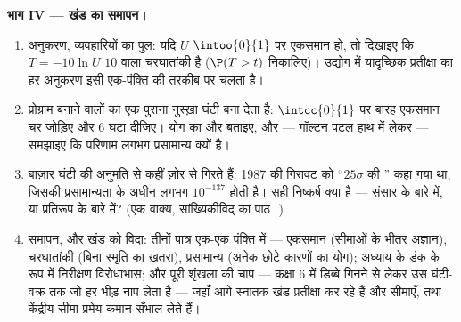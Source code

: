 \begin{problem}
\medskip
\noindent\textbf{भाग IV --- खंड का समापन।}
\begin{enumerate}[resume]
  \item अनुकरण, व्यवहारियों का पुल: यदि $U$ $\intoo{0}{1}$ पर एकसमान हो, तो दिखाइए
        कि $T = -10\ln U$  $10$ वाला चरघातांकी है ($\P(T > t)$ निकालिए)। उद्योग में
        यादृच्छिक प्रतीक्षा का हर अनुकरण इसी एक-पंक्ति की तरकीब पर चलता है।
  \item प्रोग्राम बनाने वालों का एक पुराना नुस्ख़ा घंटी बना देता है: $\intcc{0}{1}$ पर
        बारह  एकसमान चर जोड़िए और $6$ घटा दीजिए। योग का  और
         बताइए, और --- गॉल्टन पटल हाथ में लेकर --- समझाइए कि परिणाम
        लगभग प्रसामान्य क्यों है।
  \item बाज़ार घंटी की अनुमति से कहीं ज़ोर से गिरते हैं: 1987 की गिरावट को
        ``$25\sigma$ की '' कहा गया था, जिसकी प्रसामान्यता के अधीन 
        लगभग $10^{-137}$ होती है। सही निष्कर्ष क्या है --- संसार के बारे में, या
        प्रतिरूप के बारे में? (एक वाक्य, सांख्यिकीविद् का पाठ।)
  \item समापन, और खंड को विदा: तीनों पात्र एक-एक पंक्ति में --- एकसमान
        (सीमाओं के भीतर अज्ञान), चरघातांकी (बिना स्मृति का ख़तरा), प्रसामान्य
        (अनेक छोटे कारणों का योग); अध्याय के डंक के रूप में निरीक्षण
        विरोधाभास; और पूरी शृंखला की चाप --- कक्षा 6 में डिब्बे गिनने से
        लेकर उस घंटी-वक्र तक जो हर भीड़ नाप लेता है --- जहाँ आगे स्नातक खंड
        प्रतीक्षा कर रहे हैं और सीमाएँ,  तथा केंद्रीय सीमा प्रमेय कमान
        सँभाल लेते हैं।
\end{enumerate}
\end{problem}
